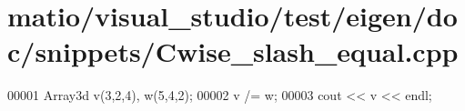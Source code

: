 \hypertarget{matio_2visual__studio_2test_2eigen_2doc_2snippets_2_cwise__slash__equal_8cpp_source}{}\section{matio/visual\+\_\+studio/test/eigen/doc/snippets/\+Cwise\+\_\+slash\+\_\+equal.cpp}
\label{matio_2visual__studio_2test_2eigen_2doc_2snippets_2_cwise__slash__equal_8cpp_source}

\begin{DoxyCode}
00001 Array3d v(3,2,4), w(5,4,2);
00002 v /= w;
00003 cout << v << endl;
\end{DoxyCode}
